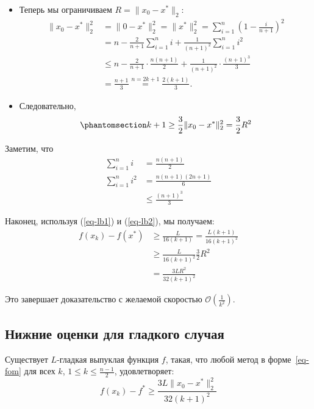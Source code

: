 \documentclass[
  russian,
  letterpaper,
  DIV=11,
  numbers=noendperiod]{scrartcl}
\begin{document}
\begin{itemize}
\item
  Теперь мы ограничиваем \(R = \|x_0 - x^*\|_2\): \[
    \begin{aligned}
    \|x_0 - x^*\|_2^2 &= \|0 - x^*\|_2^2 = \|x^*\|_2^2 = \sum_{i=1}^n \left( 1 - \frac{i}{n+1} \right)^2 \\
    &= n - \frac{2}{n+1} \sum_{i=1}^{n} i + \frac{1}{(n+1)^2} \sum_{i=1}^{n} i^2 \\
    &\leq n - \frac{2}{n+1} \cdot \frac{n(n+1)}{2} + \frac{1}{(n+1)^2} \cdot \frac{(n+1)^3}{3} \\
    &= \frac{n+1}{3} \overset{n = 2k+1}{=} \frac{2(k+1)}{3}.
    \end{aligned}
    \]
\item
  Следовательно, \begin{equation}\phantomsection\label{eq-lb2}{
    k+1 \geq \frac{3}{2}\|x_0 - x^*\|_2^2 = \frac32 R^2
    }\end{equation}
\end{itemize}

Заметим, что \[
\begin{aligned}
\sum_{i=1}^{n} i &= \frac{n(n+1)}{2} \\
\sum_{i=1}^{n} i^2 &= \frac{n(n+1)(2n+1)}{6} \\
&\leq \frac{(n+1)^3}{3}
\end{aligned}
\]

Наконец, используя (\ref{eq-lb1}) и (\ref{eq-lb2}), мы получаем: \[
\begin{aligned}
f(x_k) - f(x^*) &\geq \frac{L}{16(k+1)}  = \frac{L (k+1)}{16(k+1)^2} \\
&\geq \frac{L}{16(k+1)^2} \frac{3}{2} R^2  \\
&= \frac{3L R^2}{32 (k+1)^2}
\end{aligned}
\]

Это завершает доказательство с желаемой скоростью
\(\mathcal{O}\left( \frac{1}{k^2}\right)\).

\subsection{Нижние оценки для гладкого
случая}\label{ux43dux438ux436ux43dux438ux435-ux43eux446ux435ux43dux43aux438-ux434ux43bux44f-ux433ux43bux430ux434ux43aux43eux433ux43e-ux441ux43bux443ux447ux430ux44f}

\begin{tcolorbox}[enhanced jigsaw, colbacktitle=quarto-callout-color!10!white, opacitybacktitle=0.6, arc=.35mm, toptitle=1mm, rightrule=.15mm, opacityback=0, titlerule=0mm, breakable, title=\textcolor{quarto-callout-color}{\faInfo}\hspace{0.5em}{Гладкий выпуклый случай}, colframe=quarto-callout-color-frame, coltitle=black, bottomtitle=1mm, left=2mm, toprule=.15mm, bottomrule=.15mm, colback=white, leftrule=.75mm]

Существует \(L\)-гладкая выпуклая функция \(f\), такая, что любой метод
в форме~\ref{eq-fom} для всех \(k\), \(1 \leq k \leq \frac{n-1}{2}\),
удовлетворяет: \[
f(x_k) - f^* \geq \frac{3L \|x_0 - x^*\|_2^2}{32(k+1)^2}
\]

\end{tcolorbox}
\end{document}
